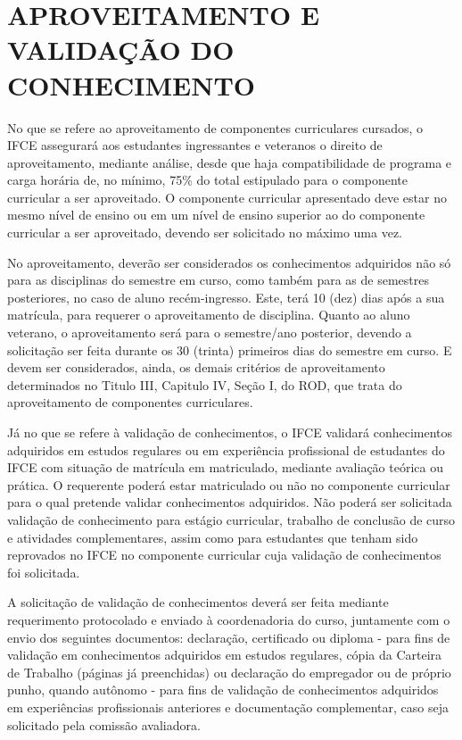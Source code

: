 
\clearpage
\section{APROVEITAMENTO E VALIDAÇÃO DO CONHECIMENTO}

No que se refere ao aproveitamento de componentes curriculares cursados, o IFCE assegurará aos estudantes ingressantes e veteranos o direito de aproveitamento, mediante análise, desde que haja compatibilidade de programa e carga horária de, no mínimo, 75\% do total estipulado para o componente curricular a ser aproveitado. O componente curricular apresentado deve estar no mesmo nível de ensino ou em um nível de ensino superior ao do componente curricular a ser aproveitado, devendo ser solicitado no máximo uma vez. 

No aproveitamento, deverão ser considerados os conhecimentos adquiridos não só para as disciplinas do semestre em curso, como também para as de semestres posteriores, no caso de aluno recém-ingresso. Este, terá 10 (dez) dias após a sua matrícula, para requerer o aproveitamento de disciplina. Quanto ao aluno veterano, o aproveitamento será para o semestre/ano posterior, devendo a solicitação ser feita durante os 30 (trinta) primeiros dias do semestre em curso. E devem ser considerados, ainda, os demais critérios de aproveitamento determinados no Titulo III, Capitulo IV, Seção I, do ROD, que trata do aproveitamento de componentes curriculares.

Já no que se refere à validação de conhecimentos, o IFCE validará conhecimentos adquiridos em estudos regulares ou em experiência profissional de estudantes do IFCE com situação de matrícula em matriculado, mediante avaliação teórica ou prática. O requerente poderá estar matriculado ou não no componente curricular para o qual pretende validar conhecimentos adquiridos. 
Não poderá ser solicitada validação de conhecimento para estágio curricular, trabalho de conclusão de curso e atividades complementares, assim como para estudantes que tenham sido reprovados no IFCE no componente curricular cuja validação de conhecimentos foi solicitada.

A solicitação de validação de conhecimentos deverá ser feita mediante requerimento protocolado e enviado à coordenadoria do curso, juntamente com o envio dos seguintes documentos: declaração, certificado ou diploma - para fins de validação em conhecimentos adquiridos em estudos regulares, cópia da Carteira de Trabalho (páginas já preenchidas) ou declaração do empregador ou de próprio punho, quando autônomo - para fins de validação de conhecimentos adquiridos em experiências profissionais anteriores e documentação complementar, caso seja solicitado pela comissão avaliadora.

